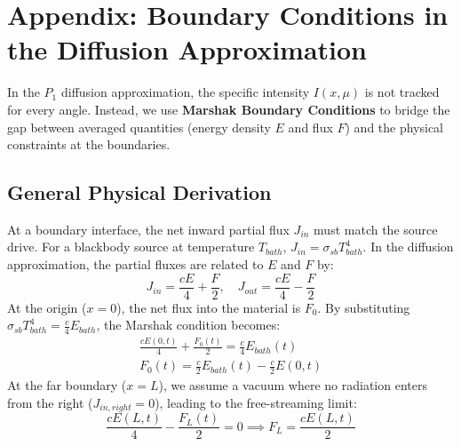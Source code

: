 \documentclass[11pt]{article}
\begin{document}
  \newpage
  \newpage
  \section{Appendix: Boundary Conditions in the Diffusion Approximation}
  
  In the $P_1$ diffusion approximation, the specific intensity $I(x, \mu)$ is not tracked for every angle. Instead, we use \textbf{Marshak Boundary Conditions} to bridge the gap between averaged quantities (energy density $E$ and flux $F$) and the physical constraints at the boundaries.
  
\subsection{General Physical Derivation}
At a boundary interface, the net inward partial flux $J_{in}$ must match the source drive. For a blackbody source at temperature $T_{bath}$, $J_{in} = \sigma_{sb} T_{bath}^4$. In the diffusion approximation, the partial fluxes are related to $E$ and $F$ by:
\begin{equation}
    J_{in} = \frac{cE}{4} + \frac{F}{2}, \quad J_{out} = \frac{cE}{4} - \frac{F}{2}
\end{equation}
At the origin ($x=0$), the net flux into the material is $F_0$. By substituting $\sigma_{sb} T_{bath}^4 = \frac{c}{4} E_{bath}$, the Marshak condition becomes:
\begin{gather}
    \frac{cE(0,t)}{4} + \frac{F_0(t)}{2} = \frac{c}{4} E_{bath}(t) \\
    \boxed{F_0(t) = \frac{c}{2} E_{bath}(t) - \frac{c}{2} E(0,t)}
\end{gather}
At the far boundary ($x=L$), we assume a vacuum where no radiation enters from the right ($J_{in, right} = 0$), leading to the free-streaming limit:
\begin{equation}
    \frac{cE(L,t)}{4} - \frac{F_L(t)}{2} = 0 \implies \boxed{F_L = \frac{cE(L,t)}{2}}
\end{equation}
\end{document}
